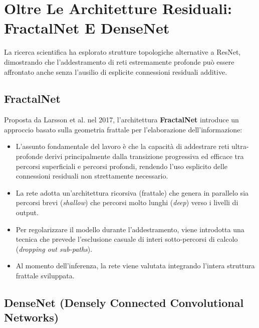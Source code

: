 ﻿\documentclass[11pt, a4paper]{article}
\begin{document}

\newpage

\section{Oltre Le Architetture Residuali: FractalNet E DenseNet}

La ricerca scientifica ha esplorato strutture topologiche alternative a ResNet, dimostrando che l'addestramento di reti estremamente profonde può essere affrontato anche senza l'ausilio di esplicite connessioni residuali additive.

\subsection{FractalNet}

Proposta da Larsson et al. nel 2017, l'architettura \textbf{FractalNet} introduce un approccio basato sulla geometria frattale per l'elaborazione dell'informazione:

\begin{itemize}
    \item L'assunto fondamentale del lavoro è che la capacità di addestrare reti ultra-profonde derivi principalmente dalla transizione progressiva ed efficace tra percorsi superficiali e percorsi profondi, rendendo l'uso esplicito delle connessioni residuali non strettamente necessario.
    \item La rete adotta un'architettura ricorsiva (frattale) che genera in parallelo sia percorsi brevi (\emph{shallow}) che percorsi molto lunghi (\emph{deep}) verso i livelli di output.
    \item Per regolarizzare il modello durante l'addestramento, viene introdotta una tecnica che prevede l'esclusione casuale di interi sotto-percorsi di calcolo (\emph{dropping out sub-paths}).
    \item Al momento dell'inferenza, la rete viene valutata integrando l'intera struttura frattale sviluppata.
\end{itemize}


\subsection{DenseNet (Densely Connected Convolutional Networks)}
\end{document}
